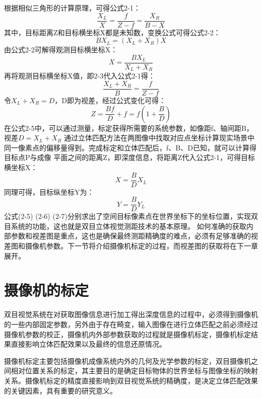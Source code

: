根据相似三角形的计算原理，可得公式2-1：
\begin{equation}
\frac{X_{L}}{X}=\frac{f}{Z-f}=\frac{X_{R}}{B-X}
\end{equation}
其中，目标距离Z和目标横坐标X都是未知数，变换公式可得公式2-2：
\begin{equation}
BX_{L}=(X_{L}+X_{R})X
\end{equation}
由公式2-2可解得观测目标横坐标X：
\begin{equation}
X=\frac{BX_{L}}{X_{L}+X_{R}}
\end{equation}
再将观测目标横坐标X值，即2-3代入公式2-1得：
\begin{equation}
\frac{X_{L}+X_{R}}{B}=\frac{f}{Z-f}
\end{equation}
令$X_{L}+X_{R}=D$，D即为视差，经过公式变化可得：
\begin{equation}
Z=\frac{Bf}{D}+f=f(1+\frac{B}{D})
\end{equation}
在公式2-5中，可以通过测量，标定获得所需要的系统参数，如像距f、轴间距B，视差$D=X_{L}+X_{R}$
通过立体匹配方法在两图像中找取对应点坐标计算现实场景中同一像素点的偏移量得到。完成标定和立体匹配后，f、B、D已知，就可以计算得目标点P与成像
平面之间的距离Z，即深度信息，将距离Z代入公式2-1，可得目标横坐标X：
\begin{equation}
X=\frac{B}{D}X_{L}
\end{equation}
同理可得，目标纵坐标Y为：
\begin{equation}
Y=\frac{B}{D}Y_{L}
\end{equation}
公式(2-5) (2-6) (2-7)分别求出了空间目标像素点在世界坐标下的坐标位置，实现双目系统的功能，这也就是双目立体视觉测距技术的基本原理。
如何准确的获取内部参数和视差图是重点，这也是确保最终测距精确度的难点，必须有足够准确的视差图和摄像机参数。下一节将介绍摄像机标定的过程，而视差图的获取将在下一章展开。

\section{摄像机的标定}

双目视觉系统在对获取图像信息进行加工得出深度信息的过程中，必须得到摄像机的一些内部固定参数，另外由于存在畸变，输入图像在进行立体匹配之前必须经过摄像机参数的校正，摄像机内外部参数获取的过程就是摄像机标定，摄像机标定结果直接影响立体匹配效果以及最终的信息还原情况。

摄像机标定主要包括摄像机成像系统内外的几何及光学参数的标定，双目摄像机之间相对位置关系的标定，其主要目的是确定目标物体的世界坐标与图像坐标的映射关系。摄像机标定的精度直接影响到双目视觉系统的精确度，是决定立体匹配效果的关键因素，具有重要的研究意义。

